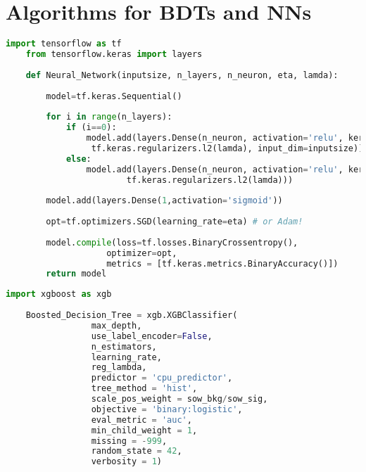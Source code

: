 \documentclass[12pt, a4paper]{book}
\begin{document}
\chapter{Algorithms for BDTs and NNs}\label{apendix:Algorithms}

\begin{lstlisting}[basicstyle=\tiny, language=Python, caption={Neural network definition using TensorFlow}, label=alg:nn, captionpos=t]
    import tensorflow as tf
    from tensorflow.keras import layers
    
    def Neural_Network(inputsize, n_layers, n_neuron, eta, lamda):
        
        model=tf.keras.Sequential()      
        
        for i in range(n_layers):       
            if (i==0):                  
                model.add(layers.Dense(n_neuron, activation='relu', kernel_regularizer=
                 tf.keras.regularizers.l2(lamda), input_dim=inputsize))
            else:                       
                model.add(layers.Dense(n_neuron, activation='relu', kernel_regularizer=
                        tf.keras.regularizers.l2(lamda)))
                        
        model.add(layers.Dense(1,activation='sigmoid')) 
        
        opt=tf.optimizers.SGD(learning_rate=eta) # or Adam!
        
        model.compile(loss=tf.losses.BinaryCrossentropy(),
                    optimizer=opt,
                    metrics = [tf.keras.metrics.BinaryAccuracy()])
        return model
\end{lstlisting}

\begin{lstlisting}[basicstyle=\tiny, language=Python, caption={Boosted Decision Tree definition using XGBoost}, label=alg:xgb, captionpos=t]
    import xgboost as xgb
    
    Boosted_Decision_Tree = xgb.XGBClassifier(
                 max_depth, 
                 use_label_encoder=False,
                 n_estimators,
                 learning_rate,
                 reg_lambda,
                 predictor = 'cpu_predictor',
                 tree_method = 'hist',
                 scale_pos_weight = sow_bkg/sow_sig,
                 objective = 'binary:logistic',
                 eval_metric = 'auc',
                 min_child_weight = 1,
                 missing = -999,
                 random_state = 42,
                 verbosity = 1) 
 \end{lstlisting}
\end{document}

